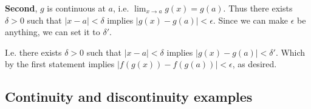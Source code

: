 \textbf{Second}, $g$ is continuous at $a$, i.e.
$\lim_{x\to a}g(x)=g(a)$. Thus there exists $\delta>0$ such that
$|x-a|<\delta$ implies $|g(x)-g(a)|<\epsilon$. Since we can make
$\epsilon$ be anything, we can set it to $\delta'$.

\vs

I.e. there exists $\delta>0$ such that $|x-a|<\delta$ implies
$|g(x)-g(a)|<\delta'$. Which by the first statement implies
$|f(g(x))-f(g(a))|<\epsilon$, as desired.

\subsection{Continuity and discontinuity examples}


